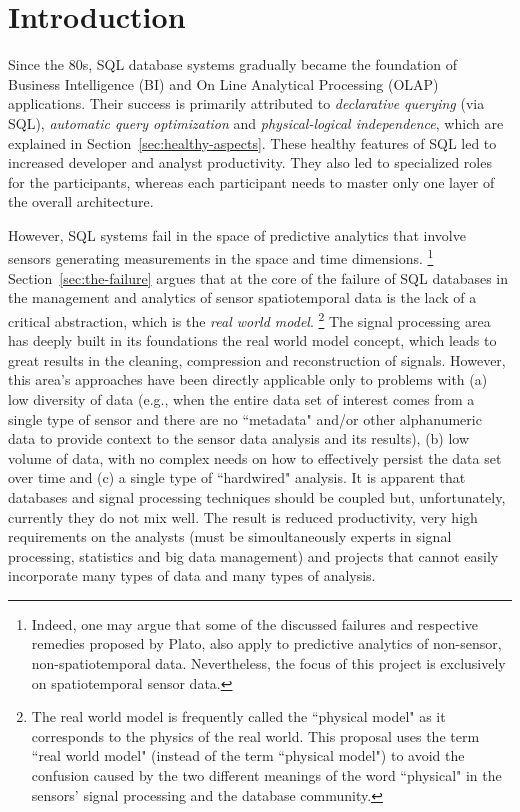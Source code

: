 
\section{Introduction}
\label{sec:introduction}
Since the 80s, SQL database systems gradually became the foundation of Business Intelligence (BI) and On Line Analytical Processing (OLAP) applications. Their success is primarily attributed to {\em declarative querying} (via SQL), {\em automatic query optimization} and {\em physical-logical independence}, which are explained in Section~\ref{sec:healthy-aspects}. These healthy features of SQL led to increased developer and analyst productivity. They also led to specialized roles for the participants, whereas each participant needs to master only one layer of the overall architecture. 

However, SQL systems fail in the space of predictive analytics that involve sensors generating measurements in the space and time dimensions.%
\footnote{Indeed, one may argue that some of the discussed failures and respective remedies proposed by Plato, also apply to predictive analytics of non-sensor, non-spatiotemporal data. Nevertheless, the focus of this project is exclusively on spatiotemporal sensor data.
}
Section~\ref{sec:the-failure} argues that at the core of the failure of SQL databases in the management and analytics of sensor spatiotemporal data is the lack of a critical abstraction, which is the {\em real world model}.%
\footnote{The real world model is frequently called the ``physical model" as it corresponds to the physics of the real world. This proposal uses the term ``real world model" (instead of the term ``physical model") to avoid the confusion caused by the two different meanings of the word ``physical" in the sensors' signal processing and the database community.
}
The signal processing area has deeply built in its foundations the real world model concept, which leads to great results in the cleaning, compression and reconstruction of signals. However, this area's approaches have been directly applicable only to problems with (a) low diversity of data (e.g., when the entire data set of interest comes from a single type of sensor and there are no ``metadata" and/or other alphanumeric data to provide context to the sensor data analysis and its results), (b) low volume of data, with no complex needs on how to effectively persist the data set over time and (c) a single type of ``hardwired" analysis. 
It is apparent that databases and signal processing techniques should be coupled but, unfortunately, currently they do not mix well. The result is reduced productivity, very high requirements on the analysts (must be simoultaneously experts in signal processing, statistics and big data management) and projects that cannot easily incorporate many types of data and many types of analysis.

